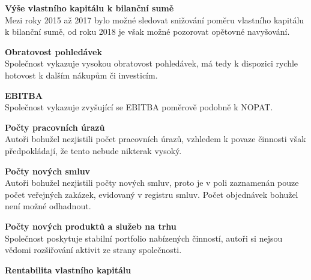 \noindent\textbf{Výše vlastního kapitálu k bilanční sumě}\\

Mezi roky 2015 až 2017 bylo možné sledovat snižování poměru vlastního kapitálu k bilanční sumě, od roku 2018 je však možné pozorovat opětovné navyšování.\\

\newpage

\noindent\textbf{Obratovost pohledávek}\\

Společnost vykazuje vysokou obratovost pohledávek, má tedy k dispozici rychle hotovost k dalším nákupům či investicím.\\

\vspace*{-2mm}

\noindent\textbf{EBITBA}\\

Společnost vykazuje zvyšující se EBITBA poměrově podobně k NOPAT.\\

\vspace*{-2mm}

\noindent\textbf{Počty pracovních úrazů}\\

Autoři bohužel nezjistili počet pracovních úrazů, vzhledem k povaze činnosti však předpokládají, že tento nebude nikterak vysoký.\\

\vspace*{-2mm}

\noindent\textbf{Počty nových smluv}\\

Autoři bohužel nezjistili počty nových smluv, proto je v poli zaznamenán pouze počet veřejných zakázek, evidovaný v registru smluv. Počet objednávek bohužel není možné odhadnout.\\

\vspace*{-2mm}

\noindent\textbf{Počty nových produktů a služeb na trhu}\\

Společnost poskytuje stabilní portfolio nabízených činností, autoři si nejsou vědomi rozšiřování aktivit ze strany společnosti.\\

\vspace*{-2mm}

\noindent\textbf{Rentabilita vlastního kapitálu}\\

